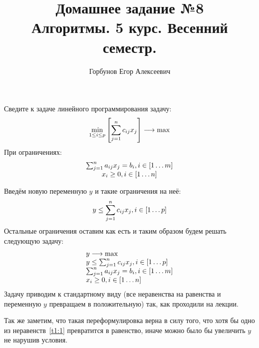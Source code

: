 

\title{Домашнее задание №8 \\ Алгоритмы. 5 курс. Весенний семестр.}
\author{Горбунов Егор Алексеевич}


\maketitle

\begin{task}[1]
Сведите к задаче линейного программирования задачу:
\[
	\min_{1 \leq i \leq p} \left[ \sum_{j = 1}^{n}{c_{ij}x_j} \right] \longrightarrow \max
\]
При ограничениях:
\[
	\begin{array}{c}
		\sum_{j = 1}^{n}{a_{ij}x_j} = b_i, i \in \left[ 1\ldots m \right] \\
		x_i \geq 0, i \in \left[ 1\ldots n \right]
	\end{array}
\]
\end{task}

\begin{solution}
Введём новую переменную $y$ и такие ограничения на неё:
\begin{equation}
\label{t1:1}
	y \leq \sum_{j = 1}^{n}{c_{ij}x_j}, i \in \left[ 1\ldots p \right]
\end{equation}
Остальные ограничения оставим как есть и таким образом будем решать следующую задачу:
\[\begin{array}{l}
	y \longrightarrow \max \\
	y \leq \sum_{j = 1}^{n}{c_{ij}x_j}, i \in \left[ 1\ldots p \right] \\
	\sum_{j = 1}^{n}{a_{ij}x_j} = b_i, i \in \left[ 1\ldots m \right] \\
	x_i \geq 0, i \in \left[ 1\ldots n \right] \\
\end{array}\]
Задачу приводим к стандартному виду (все неравенства на равенства и переменную $y$ превращаем в положительную) так, как проходили на лекции.

Так же заметим, что такая переформулировка верна в силу того, что хотя бы одно из неравенств~\ref{t1:1} превратится в равенство, иначе можно было бы увеличить $y$ не нарушив условия. \xqed
\end{solution}

